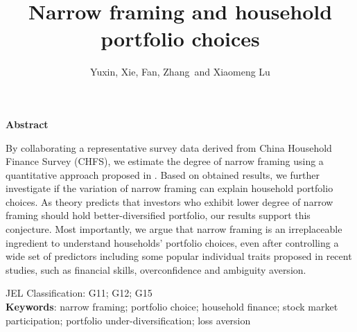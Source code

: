 \documentclass[ukenglish,nottitlepage,thmsb,11pt,letterpaper]{article}
\begin{document}
\title{\Large \bf Narrow framing and household portfolio choices\footnotemark[1]}
\date{}
\author{
	Yuxin, Xie\footnotemark[2],
	Fan, Zhang\footnotemark[3]  \  and
	 Xiaomeng Lu\footnotemark[4]
      }

\begin{minipage}[h]{\textwidth}
\maketitle
\begin{center}
\textbf{Abstract}
\end{center}

\begin{spacing}{2}
By collaborating a representative survey data derived from China Household Finance Survey (CHFS), we estimate the degree of narrow framing using a quantitative approach proposed in \citet{Barberis2009}. Based on obtained results, we further investigate if the variation of narrow framing can explain household portfolio choices. As theory predicts that investors who exhibit lower degree of narrow framing should hold better-diversified portfolio, our results support this conjecture. Most importantly, we argue that narrow framing is an irreplaceable ingredient to understand households' portfolio choices, even after controlling a wide set of predictors including some popular individual traits proposed in recent studies, such as financial skills, overconfidence and ambiguity aversion. 
\end{spacing}
JEL Classification: G11; G12; G15\\
\textbf{Keywords}: narrow framing; portfolio choice; household finance; stock market participation; portfolio under-diversification; loss aversion\\
\end{minipage}
\end{document}
